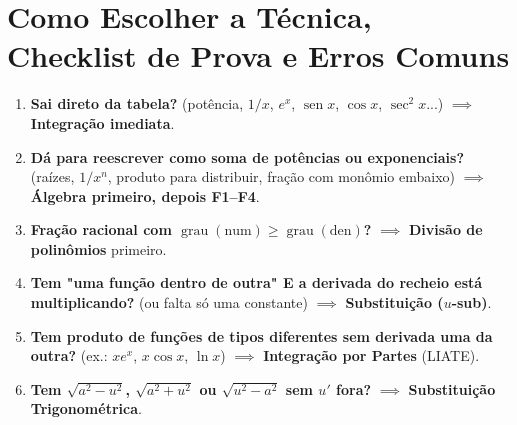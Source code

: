 \documentclass[10pt,a4paper]{article}
\DeclareMathOperator{\sen}{sen}
\begin{document}
\section{Como Escolher a Técnica, Checklist de Prova e Erros Comuns}

\begin{dica}
    \begin{enumerate}
        \item \textbf{Sai direto da tabela?} (potência, $1/x$, $e^x$, $\sen x$, $\cos x$, $\sec^2 x$...) $\implies$ \textbf{Integração imediata}.
        \item \textbf{Dá para reescrever como soma de potências ou exponenciais?} (raízes, $1/x^n$, produto para distribuir, fração com monômio embaixo) $\implies$ \textbf{Álgebra primeiro, depois F1--F4}.
        \item \textbf{Fração racional com $\operatorname{grau}(\text{num}) \ge \operatorname{grau}(\text{den})$?} $\implies$ \textbf{Divisão de polinômios} primeiro.
        \item \textbf{Tem "uma função dentro de outra" E a derivada do recheio está multiplicando?} (ou falta só uma constante) $\implies$ \textbf{Substituição ($u$-sub)}.
        \item \textbf{Tem produto de funções de tipos diferentes sem derivada uma da outra?} (ex.: $x e^x$, $x \cos x$, $\ln x$) $\implies$ \textbf{Integração por Partes} (LIATE).
        \item \textbf{Tem $\sqrt{a^2 - u^2}$, $\sqrt{a^2 + u^2}$ ou $\sqrt{u^2 - a^2}$ sem $u'$ fora?} $\implies$ \textbf{Substituição Trigonométrica}.
    \end{enumerate}
\end{dica}
\end{document}

